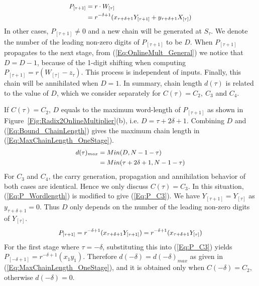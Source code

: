 \documentclass{acm_proc_article-sp}
\begin{document}
%
\begin{eqnarray}\label{Eq:P_Wordlength}
\footnotesize
  \begin{aligned}
    P_{[\tau+1]} &= r\cdot W_{[\tau]}\\
                 &= r^{-\delta+1}(x_{\tau+\delta+1}Y_{[\tau+1]}+y_{\tau+\delta+1}X_{[\tau]})\\
  \end{aligned}
\normalsize
\end{eqnarray}
%
In other cases, $P_{[\tau+1]}\!\neq\!0$ and a new chain will be generated at $S_{\tau}$. We denote the number of the leading non-zero digits of $P_{[\tau+1]}$ to be $D$. When $P_{[\tau+1]}$ propagates to the next stage, from (\ref{Eq:OnlineMult_General}) we notice that $D\!=\!D\!-\!1$, because of the 1-digit shifting when computing $P_{[\tau+1]}=r(W_{[\tau]}-z_{\tau})$. This process is independent of inputs. Finally, this chain will be annihilated when $D\!=\!1$. In summary, chain length $d(\tau)$ is related to the value of $D$, which we consider separately for $C(\tau)=C_2,~C_3$ and $C_4$.\vspace{-1ex}

If $C(\tau)=C_2$, $D$ equals to the maximum word-length of $P_{[\tau+1]}$ as shown in Figure~\ref{Fig:Radix2OnlineMultiplier}(b), i.e. $D=\tau+2\delta+1$. Combining $D$ and (\ref{Eq:Bound_ChainLength}) gives the maximum chain length in (\ref{Eq:MaxChainLength_OneStage}).
%
%
\begin{eqnarray}\label{Eq:MaxChainLength_OneStage}
\footnotesize
    \begin{aligned}
        d(\tau)_{max} &= Min(D,N-1-\tau)\\
                      &= Min(\tau+2\delta+1,N-1-\tau)
    \end{aligned}
\normalsize
\end{eqnarray}
%
For $C_3$ and $C_4$, the carry generation, propagation and annihilation behavior of both cases are identical. Hence we only discuss $C(\tau)=C_3$. In this situation, (\ref{Eq:P_Wordlength}) is modified to give (\ref{Eq:P_C3}). We have $Y_{[\tau+1]}=Y_{[\tau]}$ as $y_{\tau+\delta+1}=0$. Thus $D$ only depends on the number of the leading non-zero digits of $Y_{[\tau]}$.
%
\begin{eqnarray}\label{Eq:P_C3}
\footnotesize
  P_{[\tau+1]}=r^{-\delta+1}(x_{\tau+\delta+1}Y_{[\tau+1]})=r^{-\delta+1}(x_{\tau+\delta+1}Y_{[\tau]})
\normalsize
\end{eqnarray}
%
For the first stage where $\tau=-\delta$, substituting this into (\ref{Eq:P_C3}) yields $P_{[-\delta+1]}=r^{-\delta+1}(x_1y_1)$. Therefore $d(-\delta)=d(-\delta)_{max}$ as given in (\ref{Eq:MaxChainLength_OneStage}), and it is obtained only when $C(-\delta)=C_2$, otherwise $d(-\delta)=0$.\vspace{-1ex}
\end{document}
